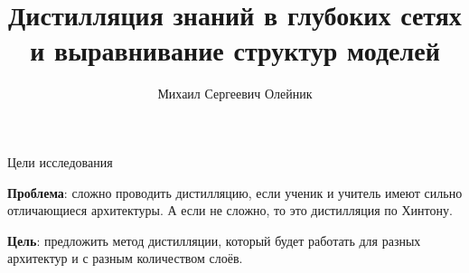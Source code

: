 \documentclass{beamer}
\title[\hbox to 56mm{Дистилляция знаний в глубоких сетях}]{Дистилляция знаний в глубоких сетях и выравнивание структур моделей}
\author[М.\,С.~Олейник]{Михаил Сергеевич Олейник}
\institute{Московский физико-технический институт}
\date{\footnotesize
\par\smallskip\emph{Курс:} Моя первая научная статья
\par\smallskip\emph{Эксперт:} О. Ю. Бахтеев
\par\smallskip\emph{Консультант:} М. Горпинич
\par\bigskip\small 2023}
\begin{document}

\begin{frame}

    \maketitle

\end{frame}


\begin{frame}{Цели исследования}

    \textbf{Проблема}: сложно проводить дистилляцию, если ученик и учитель имеют сильно отличающиеся архитектуры.
    А если не сложно, то это дистилляция по Хинтону.

    \bigskip

    \textbf{Цель}: предложить метод дистилляции, который будет работать для разных архитектур и с разным количеством слоёв.

\end{frame}

\end{document}
